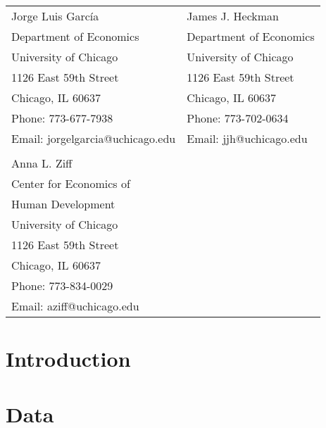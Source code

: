 \bigskip
\begin{tabular}{ll}
Jorge Luis Garc\'{i}a                                       & James J. Heckman \\
Department of Economics                                & Department of Economics \\
University of Chicago                                       & University of Chicago \\
1126 East 59th Street                                     & 1126 East 59th Street \\
Chicago, IL 60637                                           & Chicago, IL 60637 \\
Phone: 773-677-7938                                     & Phone: 773-702-0634  \\
Email: jorgelgarcia@uchicago.edu                       & Email: jjh@uchicago.edu \\
                                                                       & \\
Anna L. Ziff                                         &  \\
Center for Economics of & \\
Human Development            & \\
University of Chicago                                        &  \\
1126 East 59th Street                       & \\
Chicago, IL 60637                                              &       \\
Phone: 773-834-0029                                    &  \\
Email: aziff@uchicago.edu                     &  \\

\end{tabular}

\clearpage

\restoregeometry
\doublespacing

\setcounter{page}{0}

\section{Introduction}
\label{sec:introduction}
	

\section{Data}
\label{sec:data}


